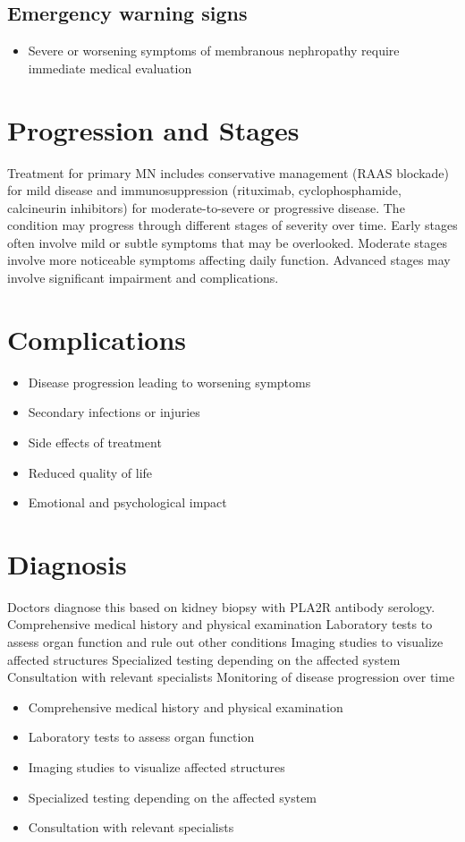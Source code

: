 \subsection{Emergency warning signs}
\begin{itemize}[noitemsep]
  \item Severe or worsening symptoms of membranous nephropathy require immediate medical evaluation
\end{itemize}
\section{Progression and Stages}
Treatment for primary MN includes conservative management (RAAS blockade) for mild disease and immunosuppression (rituximab, cyclophosphamide, calcineurin inhibitors) for moderate-to-severe or progressive disease. The condition may progress through different stages of severity over time. Early stages often involve mild or subtle symptoms that may be overlooked. Moderate stages involve more noticeable symptoms affecting daily function. Advanced stages may involve significant impairment and complications.
\section{Complications}
\begin{itemize}[noitemsep]
  \item Disease progression leading to worsening symptoms
  \item Secondary infections or injuries
  \item Side effects of treatment
  \item Reduced quality of life
  \item Emotional and psychological impact
\end{itemize}
\section{Diagnosis}
Doctors diagnose this based on kidney biopsy with PLA2R antibody serology. Comprehensive medical history and physical examination Laboratory tests to assess organ function and rule out other conditions Imaging studies to visualize affected structures Specialized testing depending on the affected system Consultation with relevant specialists Monitoring of disease progression over time

\begin{itemize}[noitemsep]
  \item Comprehensive medical history and physical examination
  \item Laboratory tests to assess organ function
  \item Imaging studies to visualize affected structures
  \item Specialized testing depending on the affected system
  \item Consultation with relevant specialists
\end{itemize}
